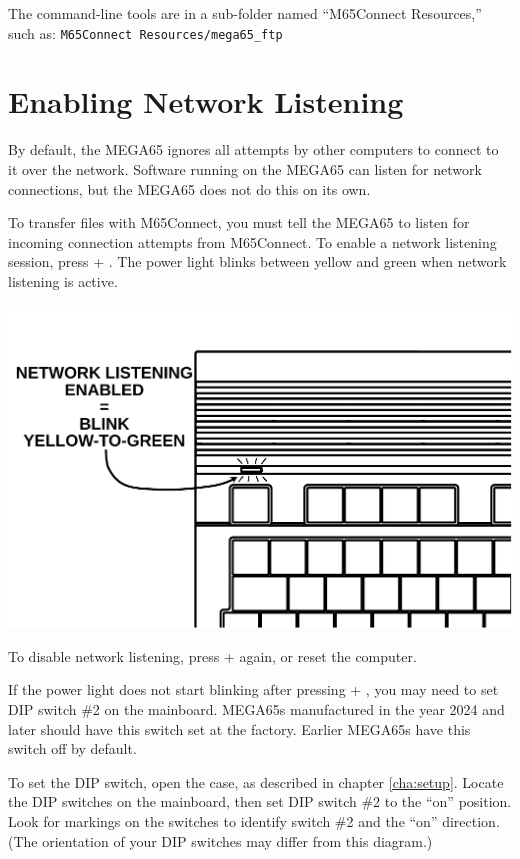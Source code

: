The command-line tools are in a sub-folder named ``M65Connect Resources,'' such as: {\tt M65Connect Resources/mega65\_ftp}

\section{Enabling Network Listening}

By default, the MEGA65 ignores all attempts by other computers to connect to it over the network. Software running on the MEGA65 can listen for network connections, but the MEGA65 does not do this on its own.

To transfer files with M65Connect, you must tell the MEGA65 to listen for incoming connection attempts from M65Connect. To enable a network listening session, press  + \megakey{\pounds}. The power light blinks between yellow and green when network listening is active.

\begin{center}
\includegraphics[width=\linewidth]{images/illustrations/mega65-eth-blink.pdf}
\end{center}

To disable network listening, press  + \megakey{\pounds} again, or reset the computer.

If the power light does not start blinking after pressing  + \megakey{\pounds}, you may need to set DIP switch \#2 on the mainboard. MEGA65s manufactured in the year 2024 and later should have this switch set at the factory. Earlier MEGA65s have this switch off by default.

To set the DIP switch, open the case, as described in chapter \vref{cha:setup}. Locate the DIP switches on the mainboard, then set DIP switch \#2 to the ``on'' position. Look for markings on the switches to identify switch \#2 and the ``on'' direction. (The orientation of your DIP switches may differ from this diagram.)

